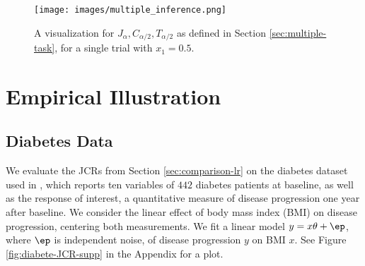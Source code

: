 \documentclass[english]{article}
\begin{document}
\begin{figure}
    \centering
    \texttt{[image: images/multiple\_inference.png]}
\caption{A visualization for $J_{\alpha}, C_{\alpha/2}, T_{\alpha/2}$ as defined in Section \ref{sec:multiple-task}, for a single trial with $x_1 = 0.5$.}
\label{fig:toy_jcr}
\end{figure}


\section{Empirical Illustration}
\label{emp}

\subsection{Diabetes Data}
\label{diab}

We evaluate 
the JCRs from 
Section \ref{sec:comparison-lr} on the diabetes dataset used in \cite{efron2004least}, 
which reports ten variables of $442$ diabetes patients at baseline, 
as well as the response of interest, a quantitative measure of disease progression one year after baseline.
We consider the linear effect of body mass index (BMI)  on disease progression,  
centering both measurements.
We fit a linear model $y = x\theta + \ep$, 
where $\ep$ is independent noise, of disease progression $y$ on BMI $x$. 
See Figure \ref{fig:diabete-JCR-supp} in the Appendix for a plot.
\end{document}
